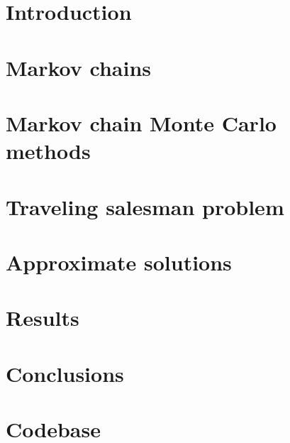 




	
	\pagebreak
	\phantom{a}
	\thispagestyle{empty}
	\pagebreak
	
	
	\newpage
	
	\tableofcontents
	\listoftables
	\listoffigures
	\clearpage
	
	\section{Introduction}
		
		\clearpage
			
	\section{Markov chains}
		
		\clearpage
	
	\section{Markov chain Monte Carlo methods}
		
		\clearpage
	
	\section{Traveling salesman problem}
		
		\clearpage
	
	\section{Approximate solutions}
		
		\clearpage
	
	\section{Results}
		
		\clearpage
	
	\section{Conclusions}
		
		\clearpage
	
	\section{Codebase}
		
		\clearpage
	
	\clearpage
	\nocite{*}
	
		
	
